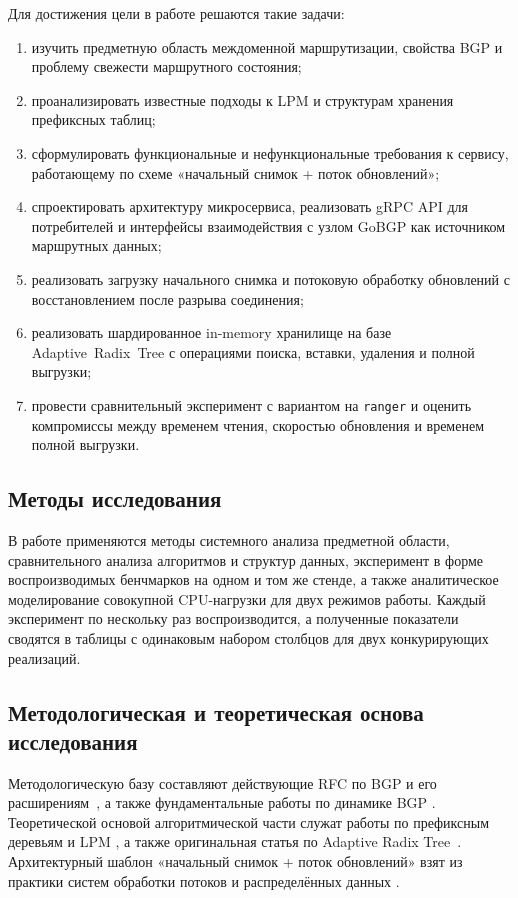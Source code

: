 Для достижения цели в работе решаются такие задачи:

\begin{enumerate}
\item изучить предметную область междоменной маршрутизации, свойства
BGP и проблему свежести маршрутного состояния;
\item проанализировать известные подходы к LPM и структурам хранения
префиксных таблиц;
\item сформулировать функциональные и нефункциональные требования к
сервису, работающему по схеме «начальный снимок + поток обновлений»;
\item спроектировать архитектуру микросервиса, реализовать gRPC API для
потребителей и интерфейсы взаимодействия с узлом GoBGP как источником
маршрутных данных;
\item реализовать загрузку начального снимка и потоковую обработку
обновлений с восстановлением после разрыва соединения;
\item реализовать шардированное in-memory хранилище на базе
Adaptive~Radix~Tree с операциями поиска, вставки, удаления и полной
выгрузки;
\item провести сравнительный эксперимент с вариантом на
\texttt{ranger} и оценить компромиссы между временем чтения, скоростью
обновления и временем полной выгрузки.
\end{enumerate}

\subsection*{Методы исследования}

В работе применяются методы системного анализа предметной области,
сравнительного анализа алгоритмов и структур данных, эксперимент в
форме воспроизводимых бенчмарков на одном и том же стенде, а также
аналитическое моделирование совокупной CPU-нагрузки для двух режимов
работы. Каждый эксперимент по нескольку раз воспроизводится, а
полученные показатели сводятся в таблицы с одинаковым набором столбцов
для двух конкурирующих реализаций.

\subsection*{Методологическая и теоретическая основа исследования}

Методологическую базу составляют действующие RFC по BGP и его
расширениям~\cite{rfc4271,rfc4760,rfc4632,rfc2918,rfc7313,rfc7854}, а
также фундаментальные работы по динамике BGP
\cite{labovitz1997instability,labovitz2000convergence,
griffin2002stablepaths}. Теоретической основой алгоритмической части
служат работы по префиксным деревьям и LPM
\cite{morrison1968patricia,nilsson1999lctries,
waldvogel1997scalable,gupta1998hardware,srinivasan1999prefixexpansion,
eatherton2004treebitmap,asai2015poptrie}, а также оригинальная статья
по Adaptive Radix Tree~\cite{leis2013art}. Архитектурный шаблон
«начальный снимок + поток обновлений» взят из практики систем
обработки потоков и распределённых данных
\cite{kreps2011kafka,akidau2015dataflow,carbone2015flink,kleppmann2017ddia}.

